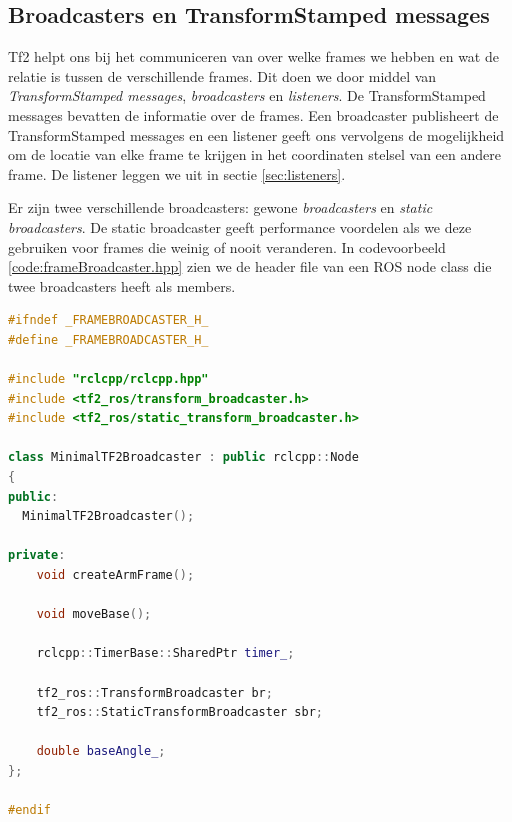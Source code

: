 \subsection{Broadcasters en TransformStamped messages}
Tf2 helpt ons bij het communiceren van over welke frames we hebben en wat de relatie is tussen de verschillende frames. Dit doen we door middel van \textit{TransformStamped messages}, \textit{broadcasters} en \textit{listeners}. De TransformStamped messages bevatten de informatie over de frames. Een broadcaster publisheert de TransformStamped messages en een listener geeft ons vervolgens de mogelijkheid om de locatie van elke frame te krijgen in het coordinaten stelsel van een andere frame. De listener leggen we uit in sectie \ref{sec:listeners}.

Er zijn twee verschillende broadcasters: gewone \textit{broadcasters} en \textit{static broadcasters}. De static broadcaster geeft performance voordelen als we deze gebruiken voor frames die weinig of nooit veranderen. In codevoorbeeld \ref{code:frameBroadcaster.hpp} zien we de header file van een ROS node class die twee broadcasters heeft als members. 

\begin{lstlisting}[language=C++, caption={frameBroadcaster.hpp; Een node met twee broadcasters. De twee frames maken samen een 1 DOF-robotarm (zie figuur \ref{fig:1DOFRobotarm} en source file in codevoorbeeld \ref{code:frameBroadcaster.cpp}.}, firstnumber=0, label={code:frameBroadcaster.hpp}]
#ifndef _FRAMEBROADCASTER_H_
#define _FRAMEBROADCASTER_H_

#include "rclcpp/rclcpp.hpp"
#include <tf2_ros/transform_broadcaster.h>
#include <tf2_ros/static_transform_broadcaster.h>

class MinimalTF2Broadcaster : public rclcpp::Node
{
public:
  MinimalTF2Broadcaster();
  
private:
    void createArmFrame();
 
    void moveBase();

    rclcpp::TimerBase::SharedPtr timer_;

    tf2_ros::TransformBroadcaster br;
    tf2_ros::StaticTransformBroadcaster sbr;

    double baseAngle_;
};

#endif

\end{lstlisting}

